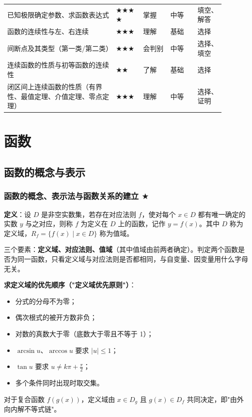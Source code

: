 \documentclass[11pt,openany,UTF8]{ctexbook}
\begin{document}
\begin{longtable}{@{}L{0.4484\linewidth}L{0.1114\linewidth}L{0.1114\linewidth}L{0.1114\linewidth}L{0.1114\linewidth}@{}}
已知极限确定参数、求函数表达式 & $\bigstar$$\bigstar$$\bigstar$$\bigstar$ & 掌握 & 中等 & 填空、解答 \\
函数的连续性与左、右连续 & $\bigstar$$\bigstar$$\bigstar$ & 理解 & 基础 & 选择 \\
间断点及其类型（第一类/第二类） & $\bigstar$$\bigstar$$\bigstar$ & 会判别 & 中等 & 选择、填空 \\
连续函数的性质与初等函数的连续性 & $\bigstar$$\bigstar$ & 了解 & 基础 & 选择 \\
闭区间上连续函数的性质（有界性、最值定理、介值定理、零点定理） & $\bigstar$$\bigstar$$\bigstar$ & 理解 & 中等 & 选择、证明 \\
\bottomrule
\end{longtable}
\endgroup

\section{函数}

\subsection{函数的概念与表示}

\subsubsection{函数的概念、表示法与函数关系的建立 $\bigstar$}

\textbf{定义}：设 $D$ 是非空实数集，若存在对应法则 $f$，使对每个 $x\in D$ 都有唯一确定的实数 $y$ 与之对应，则称 $f$ 为定义在 $D$ 上的函数，记作 $y=f(x)$。其中 $D$ 称为定义域，$R_f=\{f(x)\mid x\in D\}$ 称为值域。

三个要素：\textbf{定义域、对应法则、值域}（其中值域由前两者确定）。判定两个函数是否为同一函数，只看定义域与对应法则是否都相同，与自变量、因变量用什么字母无关。

\textbf{求定义域的优先顺序（"定义域优先原则"）}：

\begin{itemize}
\item 分式的分母不为零；
\item 偶次根式的被开方数非负；
\item 对数的真数大于零（底数大于零且不等于 1）；
\item $\arcsin u$、$\arccos u$ 要求 $\vert u\vert\le 1$；
\item $\tan u$ 要求 $u\ne k\pi+\frac{\pi}{2}$；
\item 多个条件同时出现时取交集。
\end{itemize}
对于复合函数 $f(g(x))$，定义域由 $x\in D_g$ 且 $g(x)\in D_f$ 共同决定，即"由外向内解不等式链"。
\end{document}
